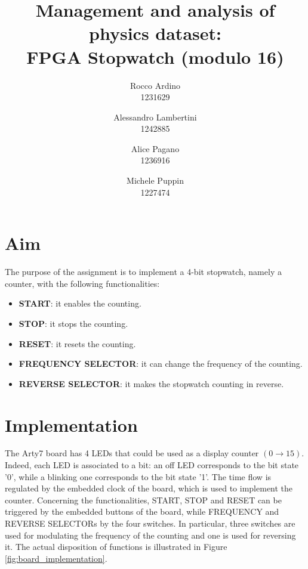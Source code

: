 \documentclass[11pt, a4paper]{article}
\begin{document}
\author{Rocco Ardino\\1231629  \and Alessandro Lambertini\\ 1242885 \and Alice Pagano \\1236916 \and Michele Puppin \\ 1227474}
\title{\textbf{Management and analysis of physics dataset: \\ FPGA  Stopwatch (modulo 16)}}
\maketitle

\section{Aim}
The purpose of the assignment is to implement a 4-bit stopwatch, namely a counter, with the following functionalities:
\begin{itemize}
\item \textbf{START}: it enables the counting.
\item \textbf{STOP}: it stops the counting.
\item \textbf{RESET}: it resets the counting.
\item \textbf{FREQUENCY SELECTOR}: it can change the frequency of the counting.
\item \textbf{REVERSE SELECTOR}: it makes the stopwatch counting in reverse.
\end{itemize}





\section{Implementation}
The Arty7 board has 4 LEDs that could be used as a display counter \( (0 \rightarrow 15) \). Indeed, each LED is associated to a bit: an off LED corresponds to the bit state '0', while a blinking one corresponds to the bit state '1'. The time flow is regulated by the embedded clock of the board, which is used to implement the counter.
Concerning the functionalities, START, STOP and RESET can be triggered by the embedded buttons of the board, while FREQUENCY and REVERSE SELECTORs by the four switches. In particular, three switches are used for modulating the frequency of the counting and one is used for reversing it. The actual disposition of functions is illustrated in Figure \ref{fig:board_implementation}.
\end{document}

